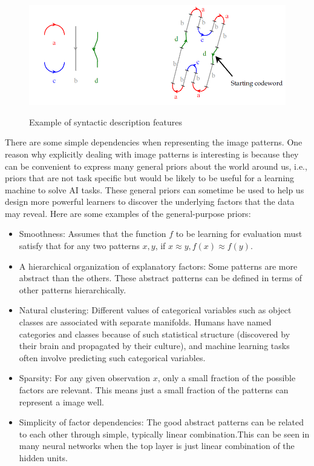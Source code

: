 \begin{figure}
  \centering
  \includegraphics [width=6in] {fig/sys.png}\\
  \caption{Example of syntactic description features}\label{sys}
\end{figure}
There are some simple dependencies when representing the image patterns. One reason why explicitly dealing with image patterns is interesting is because they can be convenient to express many general priors about the world around us, i.e., priors that are not task specific but would be likely to be useful for a learning machine to solve AI tasks\cite{bengio2007scaling}. These general priors can sometime be used to help us design more powerful learners to discover the underlying factors that the data may reveal. Here are some examples of the general-purpose priors:
\begin{itemize}
  \item Smoothness: Assumes that the function $f$ to be learning for evaluation must satisfy that for any two patterns $x,y$, if $x\approx y, f(x)\approx f(y)$.
  \item A hierarchical organization of explanatory factors: Some patterns are more abstract than the others. These abstract patterns can be defined in terms of other patterns hierarchically.
  \item Natural clustering: Different values of categorical variables such as object classes are associated with separate manifolds. Humans have named categories and classes because of such statistical structure (discovered by their brain and propagated by their culture), and machine learning tasks often involve predicting such categorical variables.
  \item Sparsity: For any given observation $x$, only a small fraction of the possible factors are relevant\cite{olshausen1996emergence}. This means just a small fraction of the patterns can represent a image well.
  \item Simplicity of factor dependencies: The good abstract patterns can be related to each other through simple, typically linear combination.This can be seen in many neural networks when the top layer is just linear combination of the hidden units.
\end{itemize}






